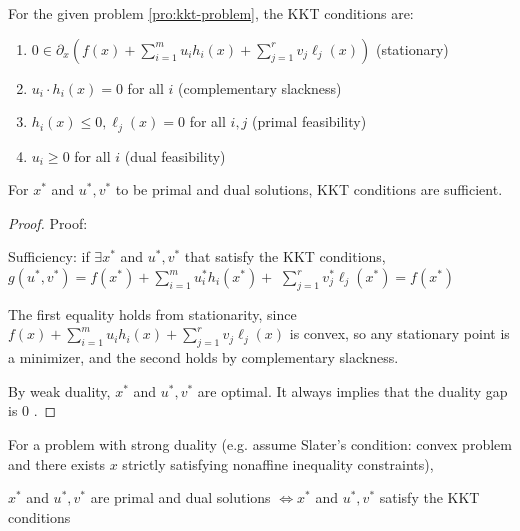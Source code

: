 For the given problem \ref{pro:kkt-problem}, the KKT conditions are:

\begin{enumerate}
    \item $ 0 \in \partial_{x}\left(f(x)+\sum_{i=1}^{m} u_{i} h_{i}(x)+\sum_{j=1}^{r} v_{j} \ell_{j}(x)\right) $ (stationary)
    \item $ u_{i} \cdot h_{i}(x)=0 $ for all $ i $ (complementary slackness)
    \item $ h_{i}(x) \leq 0, \ell_{j}(x)=0 $ for all $ i, j $ (primal feasibility)
    \item $ u_{i} \geq 0 $ for all $ i $ (dual feasibility)
\end{enumerate}

\begin{theorem}
    \label{thm:kkt-sufficient}
    For $ x^{*} $ and $ u^{*}, v^{*} $ to be primal and dual solutions, KKT conditions are sufficient.
\end{theorem}

\begin{proof}
    Proof: 
    
    Sufficiency: if $ \exists x^{*} $ and $ u^{*}, v^{*} $ that satisfy the KKT conditions, $ g\left(u^{*}, v^{*}\right)=f\left(x^{*}\right)+\sum_{i=1}^{m} u_{i}^{*} h_{i}\left(x^{*}\right)+ $ $ \sum_{j=1}^{r} v_{j}^{*} \ell_{j}\left(x^{*}\right)=f\left(x^{*}\right) $ 
    
    The first equality holds from stationarity, since $ f(x)+\sum_{i=1}^{m} u_{i} h_{i}(x)+\sum_{j=1}^{r} v_{j} \ell_{j}(x) $ is convex, so any stationary point is a minimizer, and the second holds by complementary slackness. 
    
    By weak duality, $ x^{*} $ and $ u^{*}, v^{*} $ are optimal. It always implies that the duality gap is 0 .
\end{proof}

\begin{theorem}
    For a problem with strong duality (e.g. assume Slater's condition: convex problem and there exists $ x $ strictly satisfying nonaffine inequality constraints),

    $ x^{*} $ and $ u^{*}, v^{*} $ are primal and dual solutions $ \Longleftrightarrow x^{*} $ and $ u^{*}, v^{*} $ satisfy the KKT conditions
\end{theorem}


